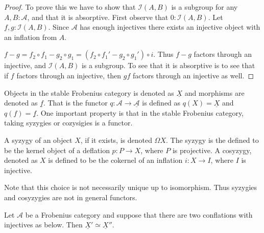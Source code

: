     \begin{proof}
        To prove this we have to show that $\mathcal{I}(A,B)$ is a subgroup for any $A,B:\mathcal{A}$, and that it is absorptive.
        First observe that $0:\mathcal{I}(A,B)$. Let $f,g:\mathcal{I}(A,B)$. Since $\mathcal{A}$ has enough injectives there exists an injective object with an inflation from $A$.
        \begin{center}
        \end{center}
        $f-g = f_2 \circ f_1 - g_2 \circ g_1 = (f_2 \circ f_1' - g_2 \circ g_1') \circ i$. Thus $f-g$ factors through an injective, and $\mathcal{I}(A,B)$ is a subgroup.
        To see that it is absorptive is to see that if $f$ factors through an injective, then $gf$ factors through an injective as well.
    \end{proof}

    Objects in the stable Frobenius category is denoted as $\underline{X}$ and morphisms are denoted as $\underline{f}$. That is the functor $q:\mathcal{A}\rightarrow\underline{\mathcal{A}}$ is defined as $q(X)=\underline{X}$ and $q(f)=\underline{f}$. One important property is that in the stable Frobenius category, taking syzygies or cozysigies is a functor.

    \begin{definition}
        A syzygy of an object $X$, if it exists, is denoted $\Omega X$. The syzygy is the defined to be the kernel object of a deflation $p:P\rightarrow X$, where $P$ is projective. A cosyzygy, denoted as \upside{$\Omega$}$X$ is defined to be the cokernel of an inflation $i:X\rightarrow I$, where $I$ is injective.
    \end{definition}

    \begin{remark}
        Note that this choice is not necessarily unique up to isomorphism. Thus syzygies and cosyzygies are not in general functors.
    \end{remark}

    \begin{lemma}
        Let $\mathcal{A}$ be a Frobenius category and suppose that there are two conflations with injectives as below. Then $\underline{X}'\simeq\underline{X}''$.
        \begin{center}
        \end{center}
    \end{lemma}

